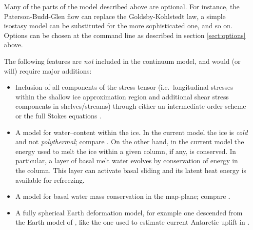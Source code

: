 \documentclass[11pt,final]{amsart}
\begin{document}
Many of the parts of the model described above are optional.  For instance, the Paterson-Budd-Glen \cite{PatersonBudd} flow can replace the Goldsby-Kohlstedt law, a simple isostasy model can be substituted for the more sophisticated one, and so on.  Options can be chosen at the command line as described in section \ref{sect:options} above.

The following features are \emph{not} included in the continuum model, and would (or will) require major additions:
\begin{itemize}
\item Inclusion of all components of the stress tensor (i.e.~longitudinal stresses within the shallow ice approximation region and additional shear stress components in shelves/streams) through either an intermediate order scheme \cite{Blatter,Hindmarsh06,SaitoEISMINT} or the full Stokes equations \cite{Fowler}.
\item A model for water--content within the ice.  In the current model the ice is \emph{cold} and not \emph{polythermal}; compare \cite{Greve}.  On the other hand, in the current model the energy used to melt the ice within a given column, if any, is conserved.  In particular, a layer of basal melt water evolves by conservation of energy in the column.  This layer can activate basal sliding and its latent heat energy is available for refreezing.
\item A model for basal water mass conservation in the map-plane; compare \cite{JohnsonFastook}.
\item A fully spherical Earth deformation model, for example one descended from the Earth model of \cite{Peltier}, like the one used to estimate current Antarctic uplift in \cite{IvinsJames2005}.
\end{itemize}
\end{document}
